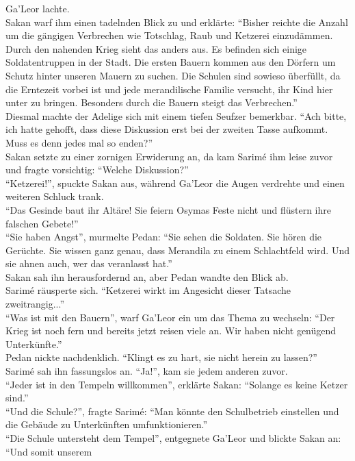 Ga'Leor lachte.\\
Sakan warf ihm einen tadelnden Blick zu und erklärte: ``Bisher reichte die Anzahl um die gängigen 
Verbrechen wie Totschlag, Raub und Ketzerei einzudämmen. Durch den nahenden Krieg sieht das anders 
aus. Es befinden sich einige Soldatentruppen in der Stadt. Die ersten Bauern kommen aus den Dörfern 
um Schutz hinter unseren Mauern zu suchen. Die Schulen sind sowieso überfüllt, da die Erntezeit 
vorbei ist und jede merandilische Familie versucht, ihr Kind hier unter zu bringen. Besonders 
durch die Bauern steigt das Verbrechen.''\\
Diesmal machte der Adelige sich mit einem tiefen Seufzer bemerkbar. ``Ach bitte, ich hatte gehofft, 
dass diese Diskussion erst bei der zweiten Tasse aufkommt. Muss es denn jedes mal so enden?''\\
Sakan setzte zu einer zornigen Erwiderung an, da kam Sarimé ihm leise zuvor und fragte vorsichtig: 
``Welche Diskussion?''\\
``Ketzerei!'', spuckte Sakan aus, während Ga'Leor die Augen verdrehte und einen weiteren Schluck 
trank.\\
``Das Gesinde baut ihr Altäre! Sie feiern Osymas Feste nicht und flüstern ihre falschen Gebete!''\\
``Sie haben Angst'', murmelte Pedan: ``Sie sehen die Soldaten. Sie hören die Gerüchte. Sie wissen 
ganz genau, dass Merandila zu einem Schlachtfeld wird. Und sie ahnen auch, wer das veranlasst 
hat.''\\
Sakan sah ihn herausfordernd an, aber Pedan wandte den Blick ab.\\
Sarimé räusperte sich. ``Ketzerei wirkt im Angesicht dieser Tatsache zweitrangig...''\\
``Was ist mit den Bauern'', warf Ga'Leor ein um das Thema zu wechseln: ``Der Krieg ist noch fern 
und bereits jetzt reisen viele an. Wir haben nicht genügend Unterkünfte.''\\
Pedan nickte nachdenklich. ``Klingt es zu hart, sie nicht herein zu lassen?''\\
Sarimé sah ihn fassungslos an. ``Ja!'', kam sie jedem anderen zuvor.\\
``Jeder ist in den Tempeln willkommen'', erklärte Sakan: ``Solange es keine Ketzer sind.''\\
``Und die Schule?'', fragte Sarimé: ``Man könnte den Schulbetrieb einstellen und die Gebäude zu 
Unterkünften umfunktionieren.''\\
``Die Schule untersteht dem Tempel'', entgegnete Ga'Leor und blickte Sakan an: ``Und somit unserem 
